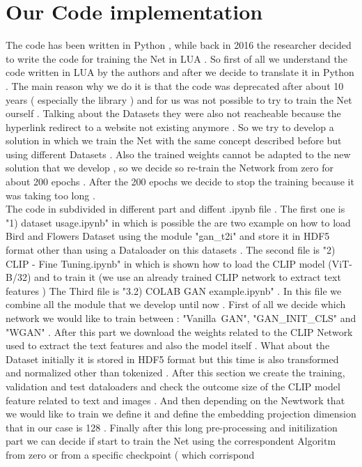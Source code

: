 
\newpage

\section*{Our Code implementation }
The code has been written in Python , while back in 2016 the researcher 
decided to write the code for training the Net in LUA .
So first of all we understand the code written in LUA by the authors and 
after we decide to translate it in Python . 
The main reason why we do it is that the code was deprecated after about 10 years (
especially the library ) and for us was not possible to try to train the Net 
ourself . 
Talking about the Datasets they were also not reacheable because the hyperlink redirect 
to a website not existing anymore .
So we try to develop a solution in which we train the Net with the same concept described 
before but using different Datasets .  
Also the trained weights cannot be adapted to the new solution that we develop ,
so we decide so re-train the Network from zero for about 200 epochs .
After the 200 epochs we decide to stop the training because it was taking too long .
\\
The code in subdivided in different part and diffent .ipynb file .
The first one is "1) dataset usage.ipynb" in which is possible the are two example 
on how to load Bird and Flowers Dataset using the module "gan\_t2i" and store it in HDF5 format 
other than using a Dataloader on this datasets .
The second file is "2) CLIP - Fine Tuning.ipynb" in which is shown how to load the CLIP model 
(ViT-B/32) and to train it (we use an already trained CLIP network to extract text features )
The Third file is "3.2) COLAB GAN example.ipynb" . In this file we combine all the 
module that we develop until now . 
First of all we decide which network we would like to train between : "Vanilla\ GAN", "GAN\_INIT\_CLS" 
and "WGAN" . 
After this part we download the weights related to the CLIP Network used to extract 
the text features and also the model itself .
What about the Dataset initially it is stored in HDF5 format but this time is also 
transformed and normalized other than tokenized .
After this section we create the training, validation and test dataloaders and check the 
outcome size of the CLIP model feature related to text and images .
And then depending on the Newtwork that we would like to train 
we define it and define the embedding projection dimension that in our case is 128 .
Finally after this long pre-processing and initilization part we can decide if start to train
the Net using the correspondent Algoritm from zero or from a specific checkpoint ( which corrispond
